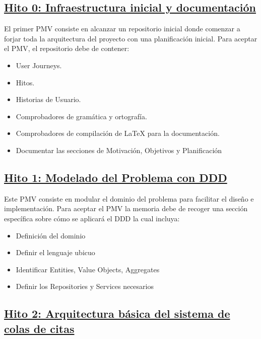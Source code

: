 \subsection*{\href{https://github.com/RubenDelgadoPareja/TFG-Triage-Inteligente-Consulta-Medica/milestone/1}{Hito 0: Infraestructura inicial y documentación}}

El primer PMV consiste en alcanzar un repositorio inicial donde comenzar a forjar toda la arquitectura del proyecto con una planificación inicial.
Para aceptar el PMV, el repositorio debe de contener:

\begin{itemize}
    \item{User Journeys.}
    \item{Hitos.}
    \item{Historias de Usuario.}
    \item{Comprobadores de gramática y ortografía.}
    \item{Comprobadores de compilación de LaTeX para la documentación.}
    \item{Documentar las secciones de Motivación, Objetivos y Planificación}
\end{itemize}

\subsection*{\href{https://github.com/RubenDelgadoPareja/TFG-Triage-Inteligente-Consulta-Medica/milestone/7}{Hito 1: Modelado del Problema con DDD}}

Este PMV consiste en modular el dominio del problema para facilitar el diseño e implementación.
Para aceptar el PMV la memoria debe de recoger una sección específica sobre cómo se aplicará el DDD la cual incluya:

\begin{itemize}
    \item {Definición del dominio}
    \item {Definir el lenguaje ubicuo}
    \item {Identificar Entities, Value Objects, Aggregates}
    \item {Definir los Repositories y Services necesarios}
\end{itemize}


\subsection*{\href{https://github.com/RubenDelgadoPareja/TFG-Triage-Inteligente-Consulta-Medica/milestone/2}{Hito 2: Arquitectura básica del sistema de colas de citas}}

